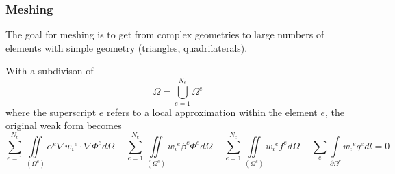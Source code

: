 \subsubsection{Meshing}
The goal for meshing is to get from complex geometries to large numbers of elements with simple geometry (triangles, quadrilaterals).\newline

With a subdivison of
\begin{equation*}
	\Omega = \bigcup\limits_{e=1}^{N_e} \Omega^e
\end{equation*}
where the superscript $e$ refers to a local approximation within the element $e$, the original weak form becomes
\begin{equation*}
	\sum_{e=1}^{N_e} \iint\limits_{\left(\Omega^e\right)} \alpha^e \nabla {w_i}^e \cdot \nabla \Phi^e d\Omega + \sum_{e=1}^{N_e} \iint\limits_{\left(\Omega^e\right)} {w_i}^e\beta^e\Phi^e d\Omega - \sum_{e=1}^{N_e} \iint\limits_{\left(\Omega^e\right)}{w_i}^e f^e d\Omega  - \sum_{e} \int\limits_{\partial \Omega^e} {w_i}^e q^e dl = 0
\end{equation*} 

